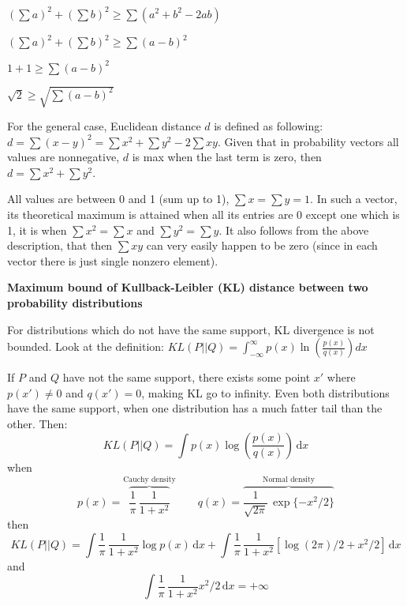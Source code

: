 \documentclass[fleqn]{article}
\begin{document}
$(\sum a)^2 + (\sum b)^2 \geq \sum (a^2 +  b^2 -  2ab)  $ 
\newline

$(\sum a)^2 + (\sum b)^2 \geq \sum (a-b)^2  $ 
\newline

$1 + 1 \geq \sum (a-b)^2  $ 
\newline

$\sqrt{2} \geq \sqrt{\sum (a-b)^2}  $ 
\newline

For the general case, Euclidean distance $d$ is defined as following: 
$d = \sum{(x-y)^2} = \sum x^2 + \sum y^2 - 2\sum xy$. Given that in probability vectors all values are nonnegative, $d$ is max when the last term is zero, then $d = \sum x^2 + \sum y^2$.

All values are between 0 and 1 (sum up to 1), $\sum x = \sum y = 1$. In such a vector, its theoretical maximum is attained when all its entries are 0 except one which is 1, it is when $\sum x^2 = \sum x$ and $\sum y^2 = \sum y$. It also follows from the above description, that then $\sum xy$ can very easily happen to be zero (since in each vector there is just single nonzero element).
\newline





\textbf{Maximum bound of Kullback-Leibler (KL) distance between two probability distributions}
\newline

For distributions which do not have the same support, KL divergence is not bounded. Look at the definition: $KL(P\vert\vert Q) = \int_{-\infty}^{\infty} p(x)\ln\left(\frac{p(x)}{q(x)}\right) dx$

If $ P $ and $ Q $ have not the same support, there exists some point $x'$ where $p(x') \neq 0$ and $q(x') = 0$, making KL go to infinity. Even both distributions have the same support, when one distribution has a much fatter tail than the other. Then:
$$KL(P\vert\vert Q) = \int p(x)\log\left(\frac{p(x)}{q(x)}\right) \,\text{d}x$$
when
$$p(x)=\overbrace{\frac{1}{\pi}\,\frac{1}{1+x^2}}^\text{Cauchy density}\qquad q(x)=\overbrace{\frac{1}{\sqrt{2\pi}}\,\exp\{-x^2/2\}}^\text{Normal density}$$
then
$$KL(P\vert\vert Q) = \int \frac{1}{\pi}\,\frac{1}{1+x^2} \log p(x) \,\text{d}x + \int \frac{1}{\pi}\,\frac{1}{1+x^2} [\log(2\pi)/2+x^2/2]\,\text{d}x$$
and
$$\int \frac{1}{\pi}\,\frac{1}{1+x^2} x^2/2\,\text{d}x=+\infty$$
\end{document}
